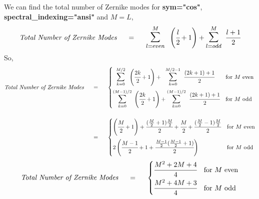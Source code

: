 We can find the total number of Zernike modes for \textbf{sym="cos"}, \textbf{spectral\_indexing="ansi"} and $M=L$,
\begin{equation}
    \textit{Total Number of Zernike Modes} \hspace{0.5cm} = \hspace{0.5cm} \mathlarger{\mathlarger{\sum}}_{l=even}^{M} \hspace{0.2cm} \left(\cfrac{l}{2}+1\right) + \mathlarger{\mathlarger{\sum}}_{l=odd}^{M} \hspace{0.2cm} \cfrac{l+1}{2}
\end{equation}
So,
\begin{equation}
    \begin{split}
        \textit{Total Number of Zernike Modes} \hspace{0.5cm} &= \hspace{0.5cm} \begin{cases}
            \hspace{0.2cm}\mathlarger{\mathlarger{\sum}}_{k=0}^{M/2} \hspace{0.2cm} \left(\cfrac{2k}{2}+1\right) + \hspace{0.2cm}\mathlarger{\mathlarger{\sum}}_{k=0}^{M/2-1} \hspace{0.2cm} \cfrac{(2k+1)+1}{2}  &\text{for $M$ even} \\[0.5cm]
            \mathlarger{\mathlarger{\sum}}_{k=0}^{(M-1)/2} \hspace{0.1cm} \left(\cfrac{2k}{2}+1\right) + \mathlarger{\mathlarger{\sum}}_{k=0}^{(M-1)/2} \hspace{0.2cm} \cfrac{(2k+1)+1}{2}  &\text{for $M$ odd} 
        \end{cases}   \\[.5cm]
        &= \hspace{0.5cm} \begin{cases}
            \left(\cfrac{M}{2}+1\right) + \cfrac{(\frac{M}{2}+1)\frac{M}{2}}{2} + \cfrac{M}{2} + \cfrac{(\frac{M}{2}-1)\frac{M}{2}}{2}  &\text{for $M$ even} \\[0.5cm]
            2 \left(\cfrac{M-1}{2}+1 + \cfrac{\frac{M-1}{2}(\frac{M-1}{2}+1)}{2} \right)&\text{for $M$ odd} 
        \end{cases}  
    \end{split}
\end{equation}
\begin{equation}
    \textit{Total Number of Zernike Modes} \hspace{0.5cm} = \hspace{0.5cm} \begin{cases}
        \cfrac{M^2 + 2M + 4}{4}  &\text{for $M$ even} \\[0.2cm]
        \cfrac{M^2 + 4M + 3}{4} &\text{for $M$ odd} 
    \end{cases} 
\end{equation}

